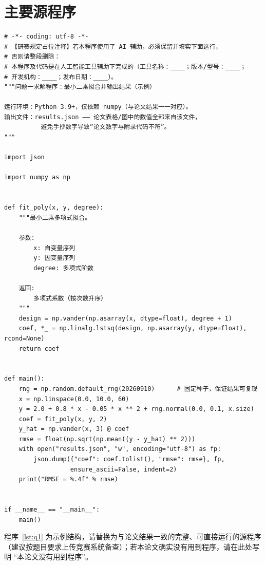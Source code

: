 \documentclass[12pt,a4paper,fontset=windows]{ctexart}
\begin{document}
\section{主要源程序}
%   

\begin{lstlisting}[caption={问题一求解程序（示例，请替换为你的完整代码）}, label={lst:q1}]
# -*- coding: utf-8 -*-
# 【研赛规定占位注释】若本程序使用了 AI 辅助，必须保留并填实下面这行，
# 否则请整段删除：
# 本程序及代码是在人工智能工具辅助下完成的（工具名称：____；版本/型号：____；
# 开发机构：____；发布日期：____）。
"""问题一求解程序：最小二乘拟合并输出结果（示例）

运行环境：Python 3.9+，仅依赖 numpy（与论文结果一一对应）。
输出文件：results.json —— 论文表格/图中的数值全部来自该文件，
          避免手抄数字导致“论文数字与附录代码不符”。
"""

import json

import numpy as np


def fit_poly(x, y, degree):
    """最小二乘多项式拟合。

    参数:
        x: 自变量序列
        y: 因变量序列
        degree: 多项式阶数

    返回:
        多项式系数（按次数升序）
    """
    design = np.vander(np.asarray(x, dtype=float), degree + 1)
    coef, *_ = np.linalg.lstsq(design, np.asarray(y, dtype=float), rcond=None)
    return coef


def main():
    rng = np.random.default_rng(20260910)      # 固定种子，保证结果可复现
    x = np.linspace(0.0, 10.0, 60)
    y = 2.0 + 0.8 * x - 0.05 * x ** 2 + rng.normal(0.0, 0.1, x.size)
    coef = fit_poly(x, y, 2)
    y_hat = np.vander(x, 3) @ coef
    rmse = float(np.sqrt(np.mean((y - y_hat) ** 2)))
    with open("results.json", "w", encoding="utf-8") as fp:
        json.dump({"coef": coef.tolist(), "rmse": rmse}, fp,
                  ensure_ascii=False, indent=2)
    print("RMSE = %.4f" % rmse)


if __name__ == "__main__":
    main()
\end{lstlisting}

程序~\ref{lst:q1} 为示例结构，请替换为与论文结果一致的完整、可直接运行的源程序
（建议按题目要求上传竞赛系统备查）；若本论文确实没有用到程序，请在此处写明
“本论文没有用到程序”。
\end{document}
